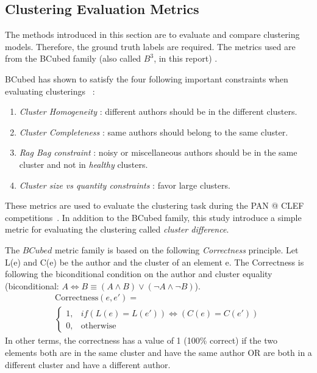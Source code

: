 \subsection{Clustering Evaluation Metrics \label{sec:clustering_evaluation_meterics}}

The methods introduced in this section are to evaluate and compare clustering models.
Therefore, the ground truth labels are required.
The metrics used are from the BCubed family (also called $B^3$, in this report) \cite{bcubed}.

BCubed has shown to satisfy the four following important constraints when evaluating clusterings \cite{bcubed}~:

\begin{enumerate}
  \item
  \textit{Cluster Homogeneity} : different authors should be in the different clusters.
  \item
  \textit{Cluster Completeness} : same authors should belong to the same cluster.
  \item
  \textit{Rag Bag constraint} : noisy or miscellaneous authors should be in the same cluster and not in \textit{healthy} clusters.
  \item
  \textit{Cluster size vs quantity constraints} : favor large clusters.
\end{enumerate}

These metrics are used to evaluate the clustering task during the PAN @ CLEF competitions~\cite{pan16}.
In addition to the BCubed family, this study introduce a simple metric for evaluating the clustering called \textit{cluster difference}.

\begin{definition}
  The $BCubed$ metric family is based on the following \textit{Correctness} principle.
  Let L(e) and C(e) be the author and the cluster of an element e.
  The Correctness is following the biconditional condition on the author and cluster equality (biconditional: $A \Longleftrightarrow B \equiv (A \land B) \lor (\neg A \land \neg B)$).
  \begin{gather*}
    \mathrm{Correctness}(e, e') = \\
    \begin{cases}
      1, & if (L(e) = L(e')) \Longleftrightarrow (C(e) = C(e'))\\
      0, & \mathrm{otherwise}
    \end{cases}
  \end{gather*}
  In other terms, the correctness has a value of 1 (100\% correct) if the two elements both are in the same cluster and have the same author OR are both in a different cluster and have a different author.
\end{definition}

